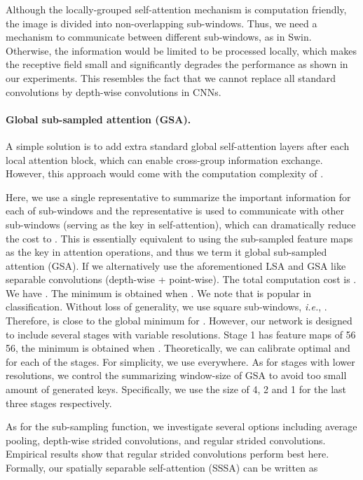 \documentclass{article}
\begin{document}
 
Although the locally-grouped self-attention mechanism is computation friendly, the image is divided into non-overlapping sub-windows. Thus, we need a mechanism to communicate between different sub-windows,  as in Swin. Otherwise, the information  would 
be limited to be processed locally, which makes the receptive field small and significantly degrades the performance as shown in our experiments. This resembles the fact that we cannot replace all standard convolutions by 
depth-wise convolutions in  CNNs. 




\paragraph{Global   sub-sampled   attention (GSA).} A simple solution is to add extra standard global self-attention layers after each local attention block,
which can enable cross-group information exchange. However, this approach would come with the computation complexity of .




Here, we use a single representative to summarize the important information for each of  sub-windows and the representative is used to communicate with other sub-windows (serving as the key in self-attention), which can dramatically reduce the cost to
. This is essentially equivalent to using the   sub-sampled   feature maps as the key in attention operations, and thus we term 
it global   sub-sampled   attention (GSA). If we alternatively use the aforementioned LSA and GSA like separable convolutions (depth-wise + point-wise). The total computation cost is .
We have 
. The minimum is obtained when . We note that  is popular in classification. Without loss of generality, we use square sub-windows, \textit{i.e.},  . Therefore,  is 
close 
to the global minimum for . However, our network is designed to include several stages with variable resolutions. Stage 1  has feature maps of 56  56, the minimum is obtained when .  Theoretically, we can calibrate optimal  and  for each of the stages. For simplicity, 
we use  everywhere.  As for stages with lower resolutions, we control the summarizing  window-size of GSA to avoid too small amount of generated keys. Specifically, we use the size of 4, 2 and 1 for the last three stages respectively. 





As for the sub-sampling function, we investigate several options including average pooling, depth-wise strided convolutions, and regular strided convolutions. Empirical results show that regular strided convolutions perform best here. Formally, our spatially separable self-attention (SSSA) can be written as
\end{document}
